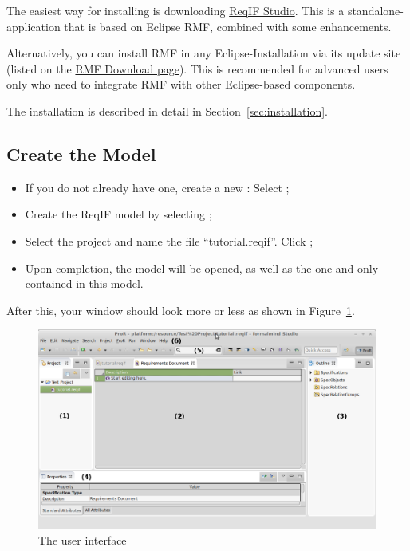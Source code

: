 The easiest way for installing \pror{} is downloading \href{https://reqif.academy}{ReqIF Studio}.  This is a standalone-application that is based on Eclipse RMF, combined with some enhancements.

 Alternatively, you can install RMF in any Eclipse-Installation via its update site (listed on the \href{https://www.eclipse.org/rmf/download.php}{RMF Download page}).  This is recommended for advanced users only who need to integrate RMF with other Eclipse-based components.

\begin{info}
The installation is described in detail in Section~\ref{sec:installation}.
\end{info}

\subsection{Create the Model}
\label{sec:create-model}

\begin{itemize}

\item
  If you do not already have one, create a new : Select  ;
\item
  Create the ReqIF model by selecting ;
\item
  Select the project and name the file ``tutorial.reqif''.  Click ;
\item
  Upon completion, the model will be opened, as well as the one and only  contained in this model.
\end{itemize}

After this, your window should look more or less as shown in Figure~\ref{fig:pror_gui}.

\begin{figure}
  \centering
  \includegraphics[width=\linewidth]{../rmf-images/Screenshot_intro.png}
  \caption{The \pror{} user interface}
  \label{fig:pror_gui}
\end{figure}

